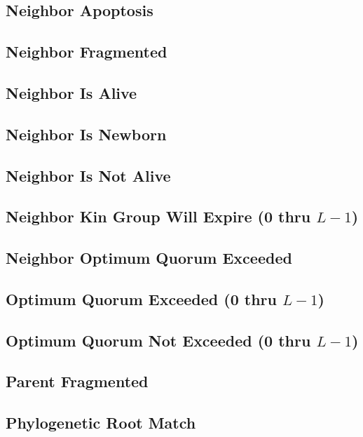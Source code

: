 \subsection{Neighbor Apoptosis}

\subsection{Neighbor Fragmented}

\subsection{Neighbor Is Alive}

\subsection{Neighbor Is Newborn}

\subsection{Neighbor Is Not Alive}

\subsection{Neighbor Kin Group Will Expire (0 thru $L-1$)}

\subsection{Neighbor Optimum Quorum Exceeded}

\subsection{Optimum Quorum Exceeded (0 thru $L-1$)}

\subsection{Optimum Quorum Not Exceeded (0 thru $L-1$)}

\subsection{Parent Fragmented}

\subsection{Phylogenetic Root Match}

